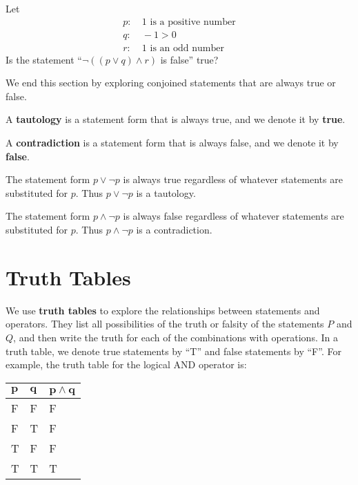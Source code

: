 \begin{exercise}
    Let
    \begin{align*}
        p: &\ \text{1 is a positive number}\\
        q: &\ -1 > 0\\
        r: &\ \text{1 is an odd number}
    \end{align*}
    Is the statement ``$\lnot((p\lor q)\land r)$ is false'' true?
\end{exercise}

We end this section by exploring conjoined statements that are always true or false.

\begin{definition}
    A \textbf{tautology} is a statement form that is always true, and we denote it by \textbf{true}.
\end{definition}
\begin{definition}
    A \textbf{contradiction} is a statement form that is always false, and we denote it by \textbf{false}.
\end{definition}
\begin{example}
    The statement form $p \lor \lnot p$ is always true regardless of whatever statements are substituted for $p$. Thus $p \lor \lnot p$ is a tautology.
\end{example}
\begin{example}
    The statement form $p \land \lnot p$ is always false regardless of whatever statements are substituted for $p$. Thus $p \land \lnot p$ is a contradiction.
\end{example}

\section{Truth Tables}
We use \textbf{truth tables} to explore the relationships between statements and operators. They list all possibilities of the truth or falsity of the statements $P$ and $Q$, and then write the truth for each of the combinations with operations. In a truth table, we denote true statements by ``T'' and false statements by ``F''. For example, the truth table for the logical AND operator is:
\begin{table}[h]
    \centering
    \begin{tabular}{|l|l||l|}
        \hline
        $\boldsymbol{p}$ & $\boldsymbol{q}$ & $\boldsymbol{p \land q}$ \\ \hline
        F   & F   & F          \\ \hline
        F   & T   & F          \\ \hline
        T   & F   & F          \\ \hline
        T   & T   & T          \\ \hline
    \end{tabular}
\end{table}

